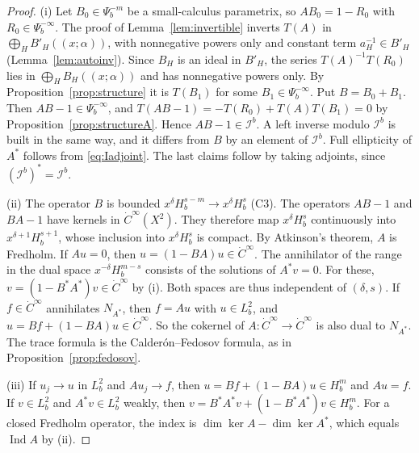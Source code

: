 \documentclass[11pt,oneside,reqno]{article}
\newcommand{\Ib}{\mathcal I^b}
\theoremstyle{plain}
\theoremstyle{definition}
\theoremstyle{remark}
\newcommand{\Lser}[1]{(\!(#1)\!)}
\begin{document}
\begin{proof}
(i) Let \(B_0\in\Psi_b^{-m}\) be a small-calculus parametrix, so
\(AB_0=1-R_0\) with \(R_0\in\Psi_b^{-\infty}\). The proof of
Lemma~\ref{lem:invertible} inverts \(T(A)\) in
\(\bigoplus_HB'_H\Lser{x;\alpha}\), with nonnegative powers only and constant
term \(a_H^{-1}\in B'_H\) (Lemma~\ref{lem:autoinv}). Since \(B_H\) is an ideal
in \(B'_H\), the series \(T(A)^{-1}T(R_0)\) lies in
\(\bigoplus_HB_H\Lser{x;\alpha}\) and has nonnegative powers only. By
Proposition~\ref{prop:structure} it is \(T(B_1)\) for some
\(B_1\in\Psi_b^{-\infty}\). Put \(B=B_0+B_1\). Then \(AB-1\in\Psi_b^{-\infty}\),
and \(T(AB-1)=-T(R_0)+T(A)T(B_1)=0\) by Proposition~\ref{prop:structureA}.
Hence \(AB-1\in\Ib\). A left inverse modulo \(\Ib\) is built in the same way,
and it differs from \(B\) by an element of \(\Ib\). Full ellipticity of \(A^*\)
follows from \eqref{eq:Iadjoint}. The last claims follow by taking adjoints,
since \((\Ib)^*=\Ib\).

(ii) The operator \(B\) is bounded \(x^\delta H^{s-m}_b\to x^\delta H^s_b\)
(C3). The operators \(AB-1\) and \(BA-1\) have kernels in
\(\dot C^\infty(X^2)\). They therefore map \(x^\delta H^s_b\) continuously
into \(x^{\delta+1}H^{s+1}_b\), whose inclusion into \(x^\delta H^s_b\) is
compact. By Atkinson's theorem, \(A\) is Fredholm. If \(Au=0\), then
\(u=(1-BA)u\in\dot C^\infty\). The annihilator of the range in the dual
space \(x^{-\delta}H^{m-s}_b\) consists of the solutions of \(A^*v=0\). For
these, \(v=(1-B^*A^*)v\in\dot C^\infty\) by (i). Both spaces are thus
independent of \((\delta,s)\). If \(f\in\dot C^\infty\) annihilates
\(N_{A^*}\), then \(f=Au\) with \(u\in L^2_b\), and
\(u=Bf+(1-BA)u\in\dot C^\infty\). So the cokernel of
\(A:\dot C^\infty\to\dot C^\infty\) is also dual to \(N_{A^*}\). The trace
formula is the Calder\'on--Fedosov formula, as in
Proposition~\ref{prop:fedosov}.

(iii) If \(u_j\to u\) in \(L^2_b\) and \(Au_j\to f\), then
\(u=Bf+(1-BA)u\in H^m_b\) and \(Au=f\). If \(v\in L^2_b\) and \(A^*v\in L^2_b\)
weakly, then \(v=B^*A^*v+(1-B^*A^*)v\in H^m_b\). For a closed Fredholm
operator, the index is \(\dim\ker A-\dim\ker A^*\), which equals
\(\operatorname{Ind}A\) by (ii).


\end{proof}
\end{document}
